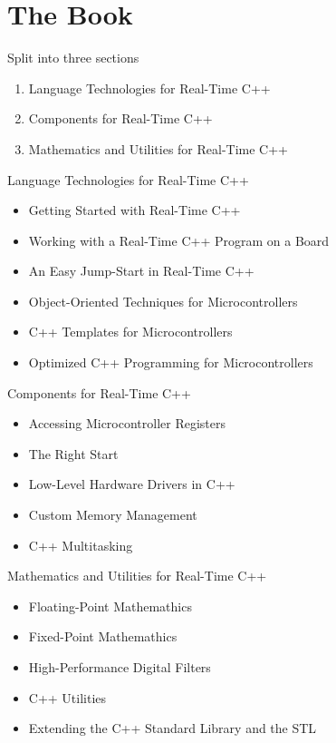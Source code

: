 \documentclass{beamer}
\begin{document}
\section{The Book}

\begin{frame}{Split into three sections}
  \begin{enumerate}[I]
  \item Language Technologies for Real-Time C++
  \item Components for Real-Time C++
  \item Mathematics and Utilities for Real-Time C++
  \end{enumerate}
\end{frame}

\begin{frame}{Language Technologies for Real-Time C++}
  \begin{itemize}
  \item Getting Started with Real-Time C++
  \item Working with a Real-Time C++ Program on a Board
  \item An Easy Jump-Start in Real-Time C++
  \item Object-Oriented Techniques for Microcontrollers
  \item C++ Templates for Microcontrollers
  \item Optimized C++ Programming for Microcontrollers
  \end{itemize}
\end{frame}

\begin{frame}{Components for Real-Time C++}
  \begin{itemize}
  \item Accessing Microcontroller Registers
  \item The Right Start
  \item Low-Level Hardware Drivers in C++
  \item Custom Memory Management
  \item C++ Multitasking
  \end{itemize}
\end{frame}

\begin{frame}{Mathematics and Utilities for Real-Time C++}
  \begin{itemize}
  \item Floating-Point Mathemathics
  \item Fixed-Point Mathemathics
  \item High-Performance Digital Filters
  \item C++ Utilities
  \item Extending the C++ Standard Library and the STL
  \end{itemize}
\end{frame}
\end{document}
